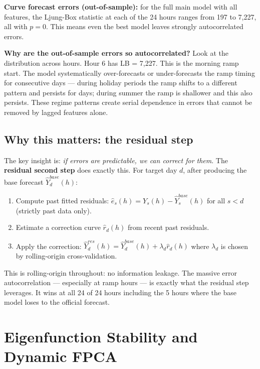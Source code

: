 \documentclass[11pt,a4paper]{article}
\begin{document}
\textbf{Curve forecast errors (out-of-sample):} for the full main
model with all features, the Ljung-Box statistic at each of the 24
hours ranges from 197 to 7,227, all with $p = 0$. This means
even the best model leaves strongly autocorrelated errors.

\begin{intuitionbox}
\textbf{Why are the out-of-sample errors so autocorrelated?}
Look at the distribution across hours. Hour 6 has LB = 7,227.
This is the morning ramp start. The model systematically
over-forecasts or under-forecasts the ramp timing for consecutive
days --- during holiday periods the ramp shifts to a different pattern and
persists for days; during summer the ramp is shallower and this
also persists. These regime patterns create serial dependence in
errors that cannot be removed by lagged features alone.
\end{intuitionbox}

\subsection{Why this matters: the residual step}

The key insight is: \emph{if errors are predictable, we can correct
for them}. The \textbf{residual second step} does exactly this.
For target day $d$, after producing the base forecast $\hat{Y}_d^{base}(h)$:

\begin{enumerate}[nosep]
  \item Compute past fitted residuals: $\hat{e}_s(h) = Y_s(h) - \hat{Y}_s^{base}(h)$
    for all $s < d$ (strictly past data only).
  \item Estimate a correction curve $\hat{r}_d(h)$ from recent past residuals.
  \item Apply the correction: $\hat{Y}_d^{res}(h) = \hat{Y}_d^{base}(h) + \lambda_d \hat{r}_d(h)$
    where $\lambda_d$ is chosen by rolling-origin cross-validation.
\end{enumerate}

This is rolling-origin throughout: no information leakage. The
massive error autocorrelation --- especially at ramp hours --- is
exactly what the residual step leverages. It wins at all 24 of 24
hours including the 5 hours where the base model loses to the official forecast.

\section{Eigenfunction Stability and Dynamic FPCA}
\end{document}
